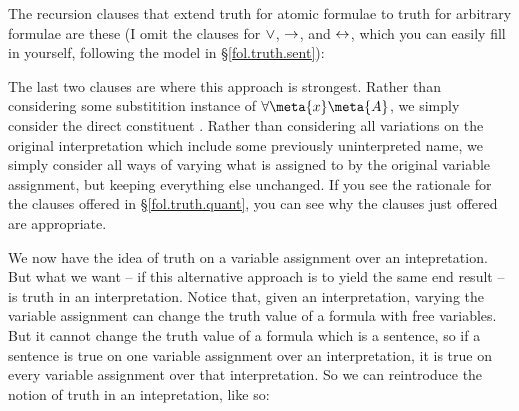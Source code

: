 The recursion clauses that extend truth for atomic formulae to truth for arbitrary formulae are these (I omit the clauses for $\vee$, $\rightarrow$, and $\leftrightarrow$, which you can easily fill in yourself, following the model in §\ref{fol.truth.sent}): 

The last two clauses are where this approach is strongest. Rather than considering some substitition instance of $\forall\meta{x}\meta{A}$, we simply consider the direct constituent . Rather than considering all variations on the original interpretation which include some previously uninterpreted name, we simply consider all ways of varying what is assigned to  by the original variable assignment, but keeping everything else unchanged. If you see the rationale for the clauses offered in §\ref{fol.truth.quant}, you can see why the clauses just offered are appropriate.

We now have the idea of truth on a variable assignment over an intepretation. But what we want – if this alternative approach is to yield the same end result – is truth in an interpretation. Notice that, given an interpretation, varying the variable assignment can change the truth value of a formula with free variables. But it cannot change the truth value of a formula which is a sentence, so if a sentence is true on one variable assignment over an interpretation, it is true on every variable assignment over that interpretation. So we can reintroduce the notion of truth in an intepretation, like so:  

